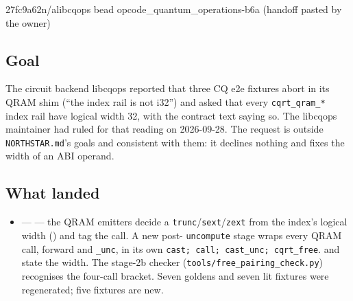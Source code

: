 %
  {27fc9a62}{n/a}{libcqops bead opcode\_quantum\_operations-b6a (handoff pasted by the owner)}

\subsection*{Goal}
The circuit backend libcqops reported that three CQ e2e fixtures abort in its
QRAM shim (``the index rail is not i32'') and asked that every
\texttt{cqrt\_qram\_*} index rail have logical width 32, with the contract text
saying so. The libcqops maintainer had ruled for that reading on 2026-09-28. The
request is outside \texttt{NORTHSTAR.md}'s goals and consistent with them: it
declines nothing and fixes the width of an ABI operand.

\subsection*{What landed}
\begin{itemize}
  \item {} ---  --- the QRAM emitters
  decide a \texttt{trunc}/\texttt{sext}/\texttt{zext} from the index's logical
  width () and tag the call. A new post-%
  \texttt{uncompute} stage wraps every QRAM call, forward and \texttt{\_unc}, in
  its own \texttt{cast; call; cast\_unc; cqrt\_free}. 
  and  state the width. The stage-2b checker
  (\texttt{tools/\allowbreak free\_pairing\_check.py}) recognises the four-call bracket. Seven goldens and seven lit fixtures were
  regenerated; five fixtures are new.
\end{itemize}

